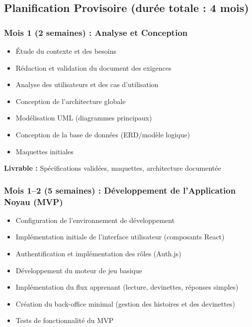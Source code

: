 \documentclass[12pt,a4paper]{article}
\begin{document}
\subsection{Planification Provisoire (durée totale : 4 mois)}

\subsubsection{Mois 1 (2 semaines) : Analyse et Conception}

\begin{itemize}
    \item Étude du contexte et des besoins
    \item Rédaction et validation du document des exigences
    \item Analyse des utilisateurs et des cas d'utilisation
    \item Conception de l'architecture globale
    \item Modélisation UML (diagrammes principaux)
    \item Conception de la base de données (ERD/modèle logique)
    \item Maquettes initiales
\end{itemize}

\textbf{Livrable :} Spécifications validées, maquettes, architecture documentée

\subsubsection{Mois 1--2 (5 semaines) : Développement de l'Application Noyau (MVP)}

\begin{itemize}
    \item Configuration de l'environnement de développement
    \item Implémentation initiale de l'interface utilisateur (composants React)
    \item Authentification et implémentation des rôles (Auth.js)
    \item Développement du moteur de jeu basique
    \item Implémentation du flux apprenant (lecture, devinettes, réponses simples)
    \item Création du back-office minimal (gestion des histoires et des devinettes)
    \item Tests de fonctionnalité du MVP
\end{itemize}
\end{document}
